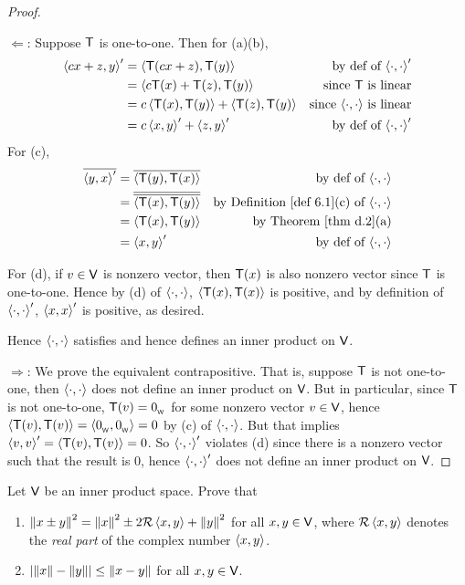 \begin{proof} \ 

\(\Longleftarrow\): Suppose \(\textsf{T}\) is one-to-one.
Then for (a)(b),
\begin{align*}
    \left< cx + z, y \right>' & = \left< \textsf{T}(cx + z), \textsf{T}(y) \right> & \text{by def of \(\left<\cdot, \cdot \right>'\)} \\
        & = \left< c\textsf{T}(x) + \textsf{T}(z), \textsf{T}(y) \right> & \text{since \(\textsf{T}\) is linear} \\
        & = c \left< \textsf{T}(x), \textsf{T}(y) \right> + \left< \textsf{T}(z), \textsf{T}(y) \right> & \text{since \(\left<\cdot, \cdot \right>\) is linear} \\
        & = c \left< x, y \right>' + \left< z, y \right>' & \text{by def of \(\left<\cdot, \cdot \right>'\)}
\end{align*}
For (c),
\begin{align*}
    \conjugatet{\LG y, x \RG'} & = \conjugatet{\LG \T(y), \T(x) \RG} & \text{by def of \(\InnerOp\)} \\
        & = \conjugatet{\conjugatet{\LG \T(x), \T(y) \RG}} & \text{by \DEF{6.1}(c) of \(\InnerOp\)} \\
        & = \LG \T(x), \T(y) \RG & \text{by \THM{d.2}(a)} \\
        & = \LG x, y \RG' & \text{by def of \(\InnerOp\)}
\end{align*}

For (d), if \(v \in \textsf{V}\) is nonzero vector, then \(\textsf{T}(x)\) is also nonzero vector since \(\textsf{T}\) is one-to-one.
Hence by (d) of \(\left< \cdot, \cdot \right>\), \(\left< \textsf{T}(x), \textsf{T}(x) \right>\) is positive, and by definition of \(\left< \cdot, \cdot \right>'\), \(\left< x, x \right>'\) is positive, as desired.

Hence \(\left< \cdot, \cdot \right>\) satisfies  and hence defines an inner product on \(\textsf{V}\).

\(\Longrightarrow\): We prove the equivalent contrapositive.
That is, suppose \(\textsf{T}\) is not one-to-one, then \(\left< \cdot, \cdot \right>\) does not define an inner product on \(\textsf{V}\).
But in particular, since \(\textsf{T}\) is not one-to-one, \(\textsf{T}(v) = 0_{_{\textsf{W}}}\) for some nonzero vector \(v \in \textsf{V}\), hence \(\left< \textsf{T}(v), \textsf{T}(v) \right> = \left< 0_{_{\textsf{W}}}, 0_{_{\textsf{W}}} \right> = 0\) by (c) of \(\left< \cdot, \cdot \right>\).
But that implies \(\left< v, v \right>' = \left< \textsf{T}(v), \textsf{T}(v) \right> = 0\).
So \(\left< \cdot, \cdot \right>'\) violates (d) since there is a nonzero vector such that the result is \(0\), hence \(\left< \cdot, \cdot \right>'\) does not define an inner product on \(\textsf{V}\).
\end{proof}

\begin{exercise} \label{exercise 6.1.19}
Let \(\textsf{V}\) be an inner product space.
Prove that
\begin{enumerate}
\item \(\left\lVert x \pm y\right\rVert^2 = \left\lVert x\right\rVert^2 \pm 2\mathcal{R}\left< x,y \right> + \left\lVert y\right\rVert^2\) for all \(x, y \in \textsf{V}\), where \(\mathcal{R}\left< x,y \right>\) denotes the \emph{real part} of the complex number \(\left< x, y \right>\).

\item \(\left| \left\lVert x\right\rVert - \left\lVert y\right\rVert \right| \le \left\lVert x- y\right\rVert\) for all \(x, y \in \textsf{V}\).
\end{enumerate}
\end{exercise}

